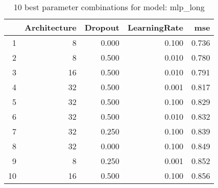 \begin{table}[ht]
\centering
\begin{tabular}{rrrrr}
  \hline
 & Architecture & Dropout & LearningRate & mse \\ 
  \hline
1 &    8 & 0.000 & 0.100 & 0.736 \\ 
  2 &    8 & 0.500 & 0.010 & 0.780 \\ 
  3 &   16 & 0.500 & 0.010 & 0.791 \\ 
  4 &   32 & 0.500 & 0.001 & 0.817 \\ 
  5 &   32 & 0.500 & 0.100 & 0.829 \\ 
  6 &   32 & 0.500 & 0.010 & 0.832 \\ 
  7 &   32 & 0.250 & 0.100 & 0.839 \\ 
  8 &   32 & 0.000 & 0.100 & 0.849 \\ 
  9 &    8 & 0.250 & 0.001 & 0.852 \\ 
  10 &   16 & 0.500 & 0.100 & 0.856 \\ 
   \hline
\end{tabular}
\caption{10 best parameter combinations for model: mlp_long} 
\label{tab:mlp_long_top_10}
\end{table}
